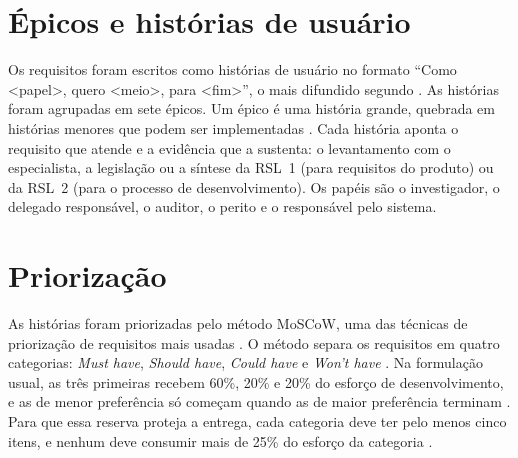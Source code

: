 \section{Épicos e histórias de usuário}
\label{sec:requisitos-historias}

Os requisitos foram escritos como histórias de usuário no formato ``Como
\textless papel\textgreater, quero \textless meio\textgreater, para
\textless fim\textgreater'', o mais difundido segundo
. As histórias foram agrupadas em sete
épicos. Um épico é uma história grande, quebrada em histórias menores que
podem ser implementadas \cite[seção 2]{lucassen2016}. Cada história aponta o
requisito que atende e a evidência que a sustenta: o levantamento com o
especialista, a legislação ou a síntese da RSL~1 (para requisitos do
produto) ou da RSL~2 (para o processo de desenvolvimento). Os papéis são o
investigador, o delegado responsável, o auditor, o perito e o responsável
pelo sistema.

\section{Priorização}
\label{sec:requisitos-priorizacao}

As histórias foram priorizadas pelo método MoSCoW, uma das técnicas de
priorização de requisitos mais usadas \cite{ais2026}. O método separa os
requisitos em quatro categorias: \textit{Must have}, \textit{Should have},
\textit{Could have} e \textit{Won't have} \cite[seção 1]{miranda2022}. Na
formulação usual, as três primeiras recebem 60\%, 20\% e 20\% do esforço de
desenvolvimento, e as de menor preferência só começam quando as de maior
preferência terminam \cite[seções 1 e 2]{miranda2022}. Para que essa reserva
proteja a entrega, cada categoria deve ter pelo menos cinco itens, e nenhum
deve consumir mais de 25\% do esforço da categoria \cite[seção 7]{miranda2022}.

